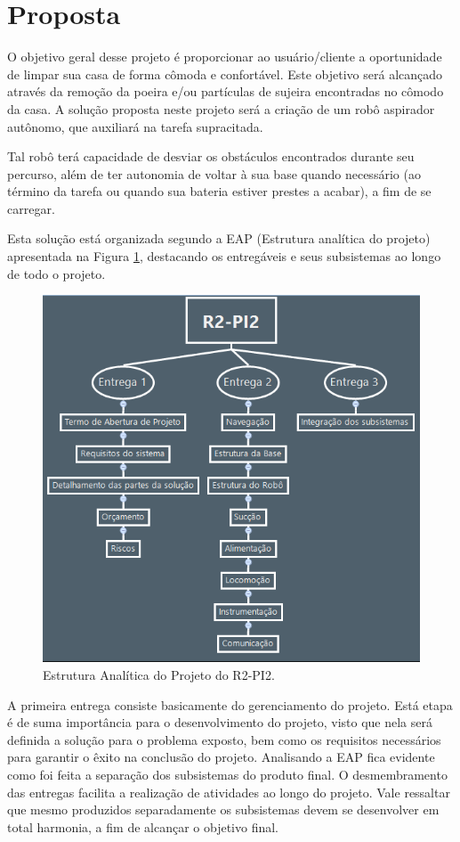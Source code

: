\section{Proposta} %
\label{sub:proposta}
	
	O objetivo geral desse projeto é proporcionar ao usuário/cliente a oportunidade de limpar sua casa de forma cômoda e confortável. Este objetivo será alcançado através da remoção da poeira e/ou partículas de sujeira encontradas no cômodo da casa. A solução proposta neste projeto será a criação de um robô aspirador autônomo, que auxiliará na tarefa supracitada. 

	Tal robô terá capacidade de desviar os obstáculos encontrados durante seu percurso, além de ter autonomia de voltar à sua base quando necessário (ao término da tarefa ou quando sua bateria estiver prestes a acabar), a fim de se carregar.

	Esta solução está organizada segundo a EAP (Estrutura analítica do projeto) apresentada na Figura \ref{img:eap}, destacando os entregáveis e seus subsistemas ao longo de todo o projeto.
	
	\begin{figure}[H]
		\centering
		\includegraphics[scale=0.55]{figuras/eap.png}
		\caption{Estrutura Analítica do Projeto do R2-PI2.}
		\label{img:eap}
	\end{figure}

	A primeira entrega consiste basicamente do gerenciamento do projeto. Está etapa é de suma importância para o desenvolvimento do projeto, visto que nela será definida a solução para o problema exposto, bem como os requisitos necessários para garantir o êxito na conclusão do projeto. Analisando a EAP fica evidente como foi feita a separação dos subsistemas do produto final. O desmembramento das entregas facilita a realização de atividades ao longo do projeto. Vale ressaltar que mesmo produzidos separadamente os subsistemas devem se desenvolver em total harmonia, a fim de alcançar o objetivo final.


